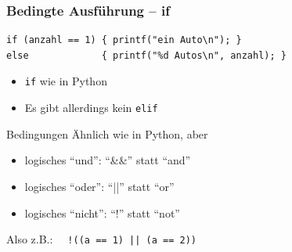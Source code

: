 \documentclass{slides}
\begin{document}
\begin{frame}[fragile]
  \frametitle{Bedingte Ausführung -- if}
\begin{lstlisting}
if (anzahl == 1) { printf("ein Auto\n"); }
else             { printf("%d Autos\n", anzahl); }
\end{lstlisting}

  \begin{itemize}
  \item \lstinline!if! wie in Python
  \item Es gibt allerdings kein \lstinline!elif!
  \end{itemize}
  \vfill

  \begin{block}{Bedingungen}
    Ähnlich wie in Python, aber
    \begin{itemize}
    \item logisches "`und"': "`\&\&"' statt "`and"'
    \item logisches "`oder"': "`||"' statt "`or"'
    \item logisches "`nicht"': "`!"' statt "`not"'
    \end{itemize}
    Also z.B.: \lstinline/  !((a == 1) || (a == 2))/
  \end{block}
\end{frame}
\end{document}
